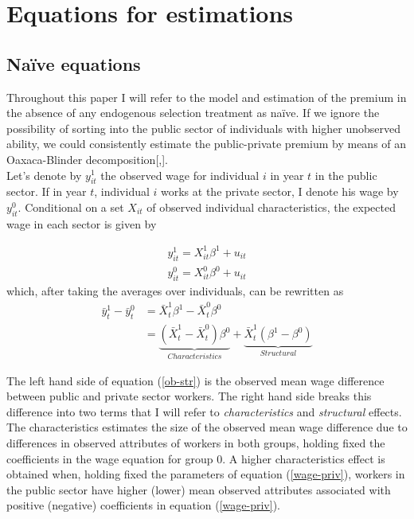 \documentclass{article}
\begin{document}
\section{Equations for estimations}
\subsection{Naïve equations}
Throughout this paper I will refer to the model and estimation of the premium in the absence of any endogenous selection treatment as naïve. If we ignore the possibility of sorting into the public sector of individuals with higher unobserved ability, we could consistently estimate the public-private premium by means of an Oaxaca-Blinder decomposition[\cite{oaxaca_male-female_1973},\cite{blinder_wage_1973}]. \\

\noindent
Let's denote by $y^{1}_{it}$ the observed wage for individual $i$ in year $t$ in the public sector. If in year $t$, individual $i$ works at the private sector, I denote his wage by $y^{0}_{it}$. Conditional on a set $X_{it}$ of observed individual characteristics, the expected wage in each sector is given by  

\begin{align}
    y_{it}^{1} = X_{it}^{1}\beta^{1}+u_{it}\\
    y_{it}^{0} = X_{it}^{0}\beta^{0}+u_{it} \label{wage-priv}
\end{align}
which, after taking the averages over individuals, can be rewritten as
\begin{align}
    \bar{y}_{t}^{1} - \bar{y}_{t}^{0} &= \bar{X}_{t}^{1}\beta^{1} -\bar{X}_{t}^{0}\beta^{0} \\
    &= \underbrace{\left(\bar{X}_{t}^{1}-\bar{X}_{t}^{0}\right)\beta^{0}}_{Characteristics} +\underbrace{\bar{X}_{t}^{1}\left(\beta^{1}-\beta^{0}\right)}_{Structural} \label{ob-str}
\end{align}      

\noindent
The left hand side of equation (\ref{ob-str}) is the observed mean wage difference between public and private sector workers. The right hand side breaks this difference into two terms that I will refer to \emph{characteristics} and \emph{structural} effects. The characteristics estimates the size of the observed mean wage difference due to differences in observed attributes of workers in both groups, holding fixed the coefficients in the wage equation for group $0$. A higher characteristics effect is obtained when, holding fixed the parameters of equation (\ref{wage-priv}), workers in the public sector have higher (lower) mean observed attributes associated with positive (negative) coefficients in equation (\ref{wage-priv}). \\
\end{document}
